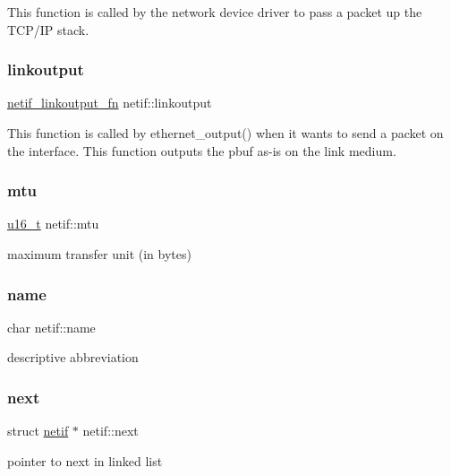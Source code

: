 This function is called by the network device driver to pass a packet up the T\+C\+P/\+IP stack. \mbox{\label{structnetif_acaaac9b415a7be73eb8a287c8ed18a8d}} 
\subsubsection{\texorpdfstring{linkoutput}{linkoutput}}
{\footnotesize\ttfamily \hyperlink{openmote-cc2538_2lwip_2src_2include_2lwip_2netif_8h_ab75e9d808bc1b788bea84213e6a111ed}{netif\+\_\+linkoutput\+\_\+fn} netif\+::linkoutput}

This function is called by ethernet\+\_\+output() when it wants to send a packet on the interface. This function outputs the pbuf as-\/is on the link medium. \mbox{\label{structnetif_aca7d56b4e0f822b0ced2885f222b8d48}} 
\subsubsection{\texorpdfstring{mtu}{mtu}}
{\footnotesize\ttfamily \hyperlink{group__compiler__abstraction_ga77570ac4fcab86864fa1916e55676da2}{u16\+\_\+t} netif\+::mtu}

maximum transfer unit (in bytes) \mbox{\label{structnetif_abd48227dcb80f70597ac0439126a0c2d}} 
\subsubsection{\texorpdfstring{name}{name}}
{\footnotesize\ttfamily char netif\+::name}

descriptive abbreviation \mbox{\label{structnetif_af6c29611a8719fc99de967f60da71c8c}} 
\subsubsection{\texorpdfstring{next}{next}}
{\footnotesize\ttfamily struct \hyperlink{structnetif}{netif} $\ast$ netif\+::next}

pointer to next in linked list \mbox{\label{structnetif_ab7ef01e505dd2feb781fe86756b1c973}} 
